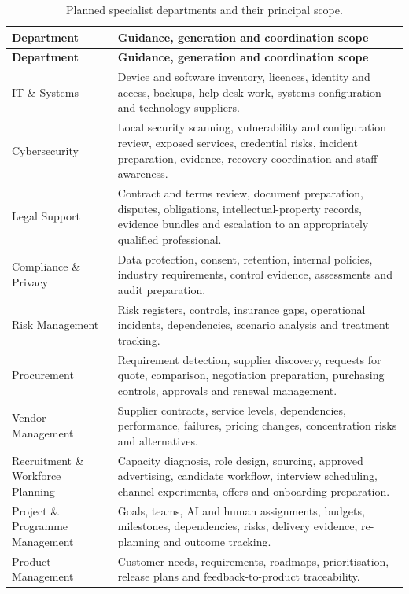 \begin{longtable}{@{}p{}p{}@{}}
\caption{Planned specialist departments and their principal scope.}
\label{tab:specialist-department-catalogue}\\
\toprule
\textbf{Department} & \textbf{Guidance, generation and coordination scope} \\
\midrule
\endfirsthead
\toprule
\textbf{Department} & \textbf{Guidance, generation and coordination scope} \\
\midrule
\endhead
IT \& Systems & Device and software inventory, licences, identity and access,
backups, help-desk work, systems configuration and technology suppliers. \\
Cybersecurity & Local security scanning, vulnerability and configuration
review, exposed services, credential risks, incident preparation, evidence,
recovery coordination and staff awareness. \\
Legal Support & Contract and terms review, document preparation, disputes,
obligations, intellectual-property records, evidence bundles and escalation to
an appropriately qualified professional. \\
Compliance \& Privacy & Data protection, consent, retention, internal policies,
industry requirements, control evidence, assessments and audit preparation. \\
Risk Management & Risk registers, controls, insurance gaps, operational
incidents, dependencies, scenario analysis and treatment tracking. \\
Procurement & Requirement detection, supplier discovery, requests for quote,
comparison, negotiation preparation, purchasing controls, approvals and renewal
management. \\
Vendor Management & Supplier contracts, service levels, dependencies,
performance, failures, pricing changes, concentration risks and alternatives. \\
Recruitment \& Workforce Planning & Capacity diagnosis, role design, sourcing,
approved advertising, candidate workflow, interview scheduling, channel
experiments, offers and onboarding preparation. \\
Project \& Programme Management & Goals, teams, AI and human assignments,
budgets, milestones, dependencies, risks, delivery evidence, re-planning and
outcome tracking. \\
Product Management & Customer needs, requirements, roadmaps, prioritisation,
release plans and feedback-to-product traceability. \\

\end{longtable}
